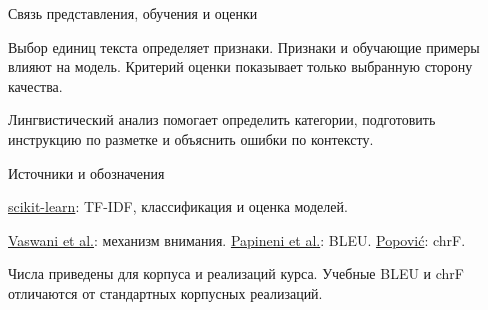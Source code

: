 \documentclass[aspectratio=169,12pt]{beamer}
\newcommand{\пр}{\kern0.04em\vrule height0.45ex depth0pt width0.06em%
  \vrule height0.06em depth0pt width0.42em\vrule height0.45ex depth0pt width0.06em\kern0.04em}
\newcommand{\формула}[1]{\par\vspace{0.25em}{\centering$\displaystyle #1$\par}\vspace{0.25em}}
\newcommand{\блок}[3]{%
  \vspace{1.4cm}
  {\color{brick}\small\bfseries БЛОК #1\par}
  \vspace{0.6cm}
  {\color{navy}\fontsize{28}{32}\selectfont\bfseries #2\par}
  \vspace{0.6cm}
  {\color{ink}\large #3\par}}
\begin{document}
\begin{frame}{Связь представления, обучения и оценки}
\color{ink}
{\small Выбор единиц текста определяет признаки. Признаки и обучающие примеры влияют на модель. Критерий оценки показывает только выбранную сторону качества.\par\vspace{0.6em}Лингвистический анализ помогает определить категории, подготовить инструкцию по разметке и объяснить ошибки по контексту.}
\end{frame}


\begin{frame}{Источники и обозначения}
\color{ink}
{\small \href{https://scikit-learn.org/stable/user_guide.html}{scikit-learn}: TF-IDF, классификация и оценка моделей.\par\vspace{0.6em}\href{https://arxiv.org/abs/1706.03762}{Vaswani et al.}: механизм внимания. \href{https://aclanthology.org/P02-1040/}{Papineni et al.}: BLEU. \href{https://aclanthology.org/W15-3049/}{Popović}: chrF.\par\vspace{0.6em}Числа приведены для корпуса и реализаций курса. Учебные BLEU и chrF отличаются от стандартных корпусных реализаций.}
\end{frame}
\end{document}
